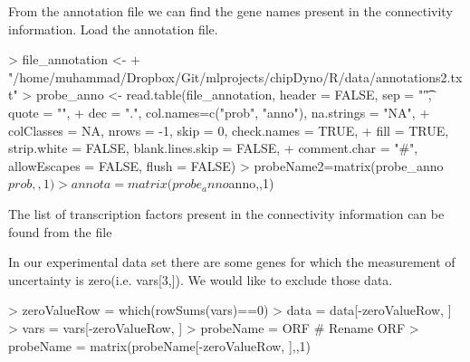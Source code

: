 \documentclass{article}
\begin{document}
From the annotation file we can find the gene names present in the connectivity information. Load the annotation file. %
\begin{Schunk}
\begin{Sinput}
> file_annotation <- 
+   "/home/muhammad/Dropbox/Git/mlprojects/chipDyno/R/data/annotations2.txt"
> probe_anno <- read.table(file_annotation, header = FALSE, sep = "\t", quote = "", 
+                          dec = ".", col.names=c("prob", "anno"), na.strings = "NA", 
+                          colClasses = NA, nrows = -1, skip = 0, check.names = TRUE, 
+                          fill = TRUE, strip.white = FALSE, blank.lines.skip = FALSE, 
+                          comment.char = "#", allowEscapes = FALSE, flush = FALSE)
> probeName2=matrix(probe_anno$prob,,1) 
> annota=matrix(probe_anno$anno,,1)
\end{Sinput}
\end{Schunk}

The list of transcription factors present in the connectivity information can be found from the file %

\begin{Schunk}
\end{Schunk}

In our experimental data set there are some genes for which the measurement of uncertainty is zero(i.e. vars[3,]). We would like to exclude those data.
\begin{Schunk}
\begin{Sinput}
> zeroValueRow = which(rowSums(vars)==0)
> data = data[-zeroValueRow, ]
> vars = vars[-zeroValueRow, ]
> probeName = ORF # Rename ORF
> probeName = matrix(probeName[-zeroValueRow, ],,1)
\end{Sinput}
\end{Schunk}
\end{document}
